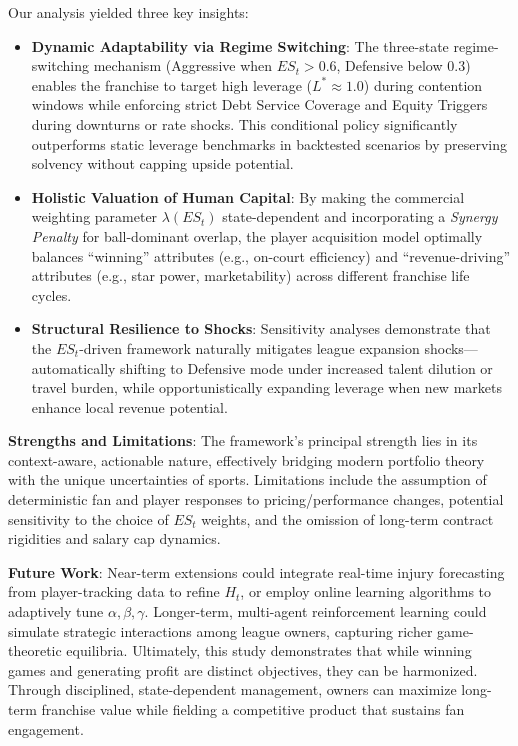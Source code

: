 \documentclass{mcmthesis}
\begin{document}
Our analysis yielded three key insights:

\begin{itemize}
    \item \textbf{Dynamic Adaptability via Regime Switching}: The three-state regime-switching mechanism (Aggressive when $ES_t > 0.6$, Defensive below $0.3$) enables the franchise to target high leverage ($L^* \approx 1.0$) during contention windows while enforcing strict Debt Service Coverage and Equity Triggers during downturns or rate shocks. This conditional policy significantly outperforms static leverage benchmarks in backtested scenarios by preserving solvency without capping upside potential.
    
    \item \textbf{Holistic Valuation of Human Capital}: By making the commercial weighting parameter $\lambda(ES_t)$ state-dependent and incorporating a \textit{Synergy Penalty} for ball-dominant overlap, the player acquisition model optimally balances ``winning'' attributes (e.g., on-court efficiency) and ``revenue-driving'' attributes (e.g., star power, marketability) across different franchise life cycles.
    
    \item \textbf{Structural Resilience to Shocks}: Sensitivity analyses demonstrate that the $ES_t$-driven framework naturally mitigates league expansion shocks—automatically shifting to Defensive mode under increased talent dilution or travel burden, while opportunistically expanding leverage when new markets enhance local revenue potential.
\end{itemize}

\textbf{Strengths and Limitations}:  
The framework's principal strength lies in its context-aware, actionable nature, effectively bridging modern portfolio theory with the unique uncertainties of sports. Limitations include the assumption of deterministic fan and player responses to pricing/performance changes, potential sensitivity to the choice of $ES_t$ weights, and the omission of long-term contract rigidities and salary cap dynamics.

\textbf{Future Work}:  
Near-term extensions could integrate real-time injury forecasting from player-tracking data to refine $H_t$, or employ online learning algorithms to adaptively tune $\alpha, \beta, \gamma$. Longer-term, multi-agent reinforcement learning could simulate strategic interactions among league owners, capturing richer game-theoretic equilibria.
Ultimately, this study demonstrates that while winning games and generating profit are distinct objectives, they can be harmonized. Through disciplined, state-dependent management, owners can maximize long-term franchise value while fielding a competitive product that sustains fan engagement.
\end{document}
